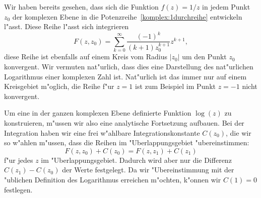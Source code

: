 \begin{beispiel}
Wir haben bereits gesehen, dass sich die Funktion $f(z)=1/z$ in jedem
Punkt $z_0$ der komplexen Ebene in die Potenzreihe~\eqref{komplex:1durchreihe}
entwickeln l"asst.
Diese Reihe l"asst sich integrieren
\[
F(z,z_0)
=
\sum_{k=0}^\infty\frac{(-1)^k}{(k+1)z_0^{k+1}}z^{k+1},
\]
diese Reihe ist ebenfalls auf einem Kreis vom Radius $|z_0|$ um den
Punkt $z_0$ konvergent.
Wir vermuten nat"urlich, dass dies eine Darstellung des nat"urlichen
Logarithmus einer komplexen Zahl ist.
Nat"urlich ist das immer nur auf einem Kreisgebiet m"oglich, die Reihe
f"ur $z=1$ ist zum Beispiel im Punkt $z=-1$ nicht konvergent.

Um eine in der ganzen komplexen Ebene definierte Funktion $\log(z)$ zu
konstruieren, m"ussen wir also eine analytische Fortsetzung aufbauen.
Bei der Integration haben wir eine frei w"ahlbare Integrationskonstante
$C(z_0)$, die wir so w"ahlen m"ussen, dass die Reihen im "Uberlappungsgebiet
"ubereinstimmen:
\[
F(z,z_0) + C(z_0) = F(z,z_1)  + C(z_1)
\]
f"ur jedes $z$ im "Uberlappungsgebiet.
Dadurch wird aber nur die Differenz $C(z_1)-C(z_0)$ der Werte festgelegt.
Da wir "Ubereinstimmung mit der "ublichen Definition des Logarithmus
erreichen m"ochten, k"onnen wir $C(1)=0$ festlegen.


\end{beispiel}
